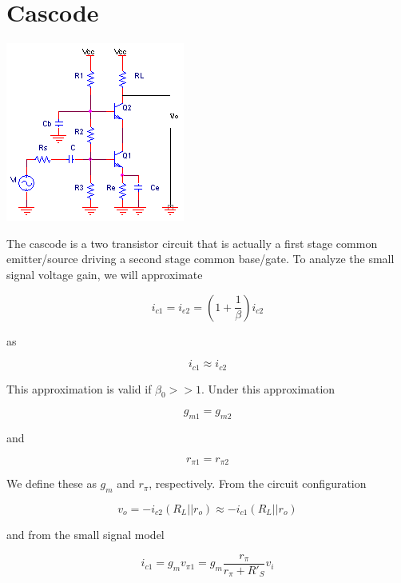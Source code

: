\section{Cascode}
\begin{center}
	\includegraphics{schematics/cascode.PNG}
\end{center}
The cascode is a two transistor circuit that is actually a first stage common emitter/source driving a second stage common base/gate. To analyze the small signal voltage gain, we will approximate

\begin{equation}
i_{c1} = i_{e2} = \left(1+\frac{1}{\beta}\right)i_{c2}
\end{equation}

\noindent as

\begin{equation}
i_{c1} \approx i_{c2}
\end{equation}

\noindent This approximation is valid if $\beta_{0} >> 1$. Under this approximation 

\begin{equation}
g_{m1} = g_{m2}
\end{equation}

\noindent and

\begin{equation}
r_{\pi 1} = r_{\pi 2}
\end{equation}

\noindent We define these as $g_{m}$ and $r_{\pi}$, respectively. From the circuit configuration

\begin{equation}
v_{o} = -i_{c2}(R_{L}||r_{o}) \approx -i_{c1}(R_{L}||r_{o})
\end{equation}

\noindent and from the small signal model

\begin{equation}
i_{c1} = g_{m}v_{\pi 1} = g_{m}\frac{r_{\pi}}{r_{\pi}+ R'_{S}}v_{i}
\end{equation}

